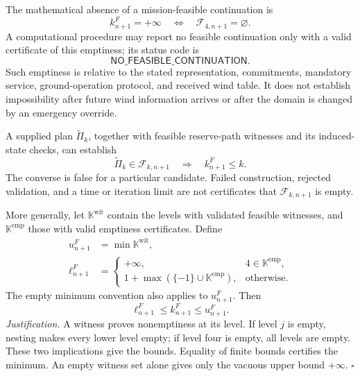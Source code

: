 The mathematical absence of a mission-feasible continuation is
\begin{equation}
k_{n+1}^F=+\infty
\quad\Longleftrightarrow\quad
\mathcal F_{4,n+1}=\varnothing.
\label{eq:no_feasible_continuation}
\end{equation}
A computational procedure may report no feasible continuation only with
a valid certificate of this emptiness; its status code is
\begin{equation*}
\mathsf{NO\_FEASIBLE\_CONTINUATION}.
\end{equation*}
Such emptiness is relative to the stated representation,
commitments, mandatory service, ground-operation protocol, and received
wind table. It does not establish impossibility after future wind
information arrives or after the domain is changed by an emergency override.

A supplied plan $\widetilde\Pi_k$, together with feasible reserve-path
witnesses and its induced-state checks, can establish
\begin{equation}
\widetilde\Pi_k\in\mathcal F_{k,n+1}
\quad\Longrightarrow\quad k_{n+1}^F\le k.
\label{eq:candidate_upper_bound}
\end{equation}
The converse is false for a particular candidate. Failed construction,
rejected validation, and a time or iteration limit are not certificates
that $\mathcal F_{k,n+1}$ is empty.

More generally, let $\mathbb K^{\mathrm{wit}}$ contain the levels with
validated feasible witnesses, and $\mathbb K^{\mathrm{emp}}$ those with
valid emptiness certificates. Define
\begin{align}
u_{n+1}^F&=\min\mathbb K^{\mathrm{wit}},
\label{eq:certified_upper}\\
\ell_{n+1}^F
&=\begin{cases}
+\infty,&4\in\mathbb K^{\mathrm{emp}},\\
1+\max(\{-1\}\cup\mathbb K^{\mathrm{emp}}),&\text{otherwise}.
\end{cases}
\label{eq:certified_lower}
\end{align}
The empty minimum convention also applies to $u_{n+1}^F$.
Then
\begin{equation}
\ell_{n+1}^F\le k_{n+1}^F\le u_{n+1}^F.
\label{eq:certificate_interval}
\end{equation}
\emph{Justification.}
A witness proves nonemptiness at its level. If level $j$ is empty,
nesting makes every lower level empty; if level four is empty, all levels
are empty. These two implications give the bounds. Equality of finite
bounds certifies the minimum. An empty witness set alone gives only the
vacuous upper bound $+\infty$. \hfill$\square$

